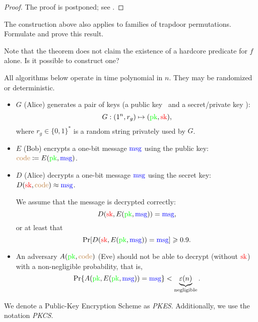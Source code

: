 \begin{proof}
    The proof is postponed; see .
\end{proof}

\begin{exercise}
    The construction above also applies to families of trapdoor permutations.
    Formulate and prove this result.
\end{exercise}

\begin{problem}
    Note that the theorem does not claim the existence of a hardcore predicate for $f$ alone.
    Is it possible to construct one?
\end{problem}

\begin{algorithm}
All algorithms below operate in time polynomial in $n$.
They may be randomized or deterministic.

\begin{itemize}
    \item $G$ (Alice) generates a pair of keys (a public key \pk\ and a secret/private key \sk):
    \[
    G: (1^n, r_g) \mapsto (\textcolor{green}{\text{pk}}, \textcolor{red}{\text{sk}}),
    \]
    where $r_g \in \{0,1\}^*$ is a random string privately used by $G$.
    \item $E$ (Bob) encrypts a one-bit message $\textcolor{blue}{\text{msg}}$ using the public key: $\textcolor{brown}{\text{code}} \coloneqq E(\textcolor{green}{\text{pk}}, \textcolor{blue}{\text{msg}})$.
    \item $D$ (Alice) decrypts a one-bit message $\textcolor{blue}{\text{msg}}$ using the secret key: $D(\textcolor{red}{\text{sk}}, \textcolor{brown}{\text{code}}) \approx \textcolor{blue}{\text{msg}}$.
    
    We assume that the message is decrypted correctly:
    \[
    D(\textcolor{red}{\text{sk}}, E(\textcolor{green}{\text{pk}}, \textcolor{blue}{\text{msg}})) = \textcolor{blue}{\text{msg}},
    \]
    or at least that
    \[
        \Pr[ D(\textcolor{red}{\text{sk}}, E(\textcolor{green}{\text{pk}}, \textcolor{blue}{\text{msg}})) = \textcolor{blue}{\text{msg}} ] \geqslant 0.9.
    \]
    \item An adversary $A(\textcolor{green}{\text{pk}}, \textcolor{brown}{\text{code}})$ (Eve) should not be able to decrypt (without $\textcolor{red}{\text{sk}}$) with a non-negligible probability, that is,
    \[
        \Pr\{ A(\textcolor{green}{\text{pk}}, E(\textcolor{green}{\text{pk}}, \textcolor{blue}{\text{msg}})) = \textcolor{blue}{\text{msg}} \} < \underbrace{\varepsilon(n)}_{\text{negligible}}.
    \]
\end{itemize}
\end{algorithm}

We denote a Public-Key Encryption Scheme as \emph{PKES}.
Additionally, we use the notation \emph{PKCS}.

